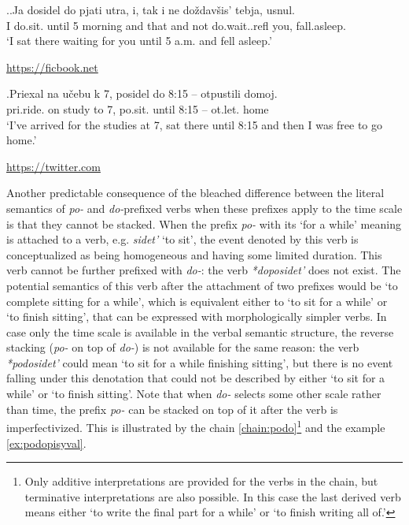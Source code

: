 \ex.\ag.\label{ex:dosidet:do}Ja dosidel do pjati utra, i, tak i ne do\v{z}dav\v{s}is' tebja, usnul.\\
I do.sit. until 5 morning and that and not do.wait..refl you, fall.asleep.\\
\vspace{0.5em}
`I sat there waiting for you until 5 a.m. and fell asleep.'
\begin{flushright}
\vspace{-0.5em}
\url{https://ficbook.net}
\end{flushright}
\bg.\label{ex:posidet:do}Priexal na u\v{c}ebu k 7, posidel do 8:15 -- otpustili domoj.\\
pri.ride. on study to 7, po.sit. until 8:15 -- ot.let. home\\
\vspace{0.5em}
`I've arrived for the studies at 7, sat there until 8:15 and then I was free to go home.'
\begin{flushright}
\vspace{-0.5em}
\url{https://twitter.com}
\end{flushright}

Another predictable consequence of the bleached difference between the literal semantics of \textit{po-} and \textit{do-}prefixed verbs when these prefixes apply to the time scale is that they cannot be stacked. When the prefix \textit{po-} with its `for a while' meaning is attached to a verb, e.g. \textit{sidet'} `to sit', the event denoted by this verb is conceptualized as being homogeneous and having some limited duration. This verb cannot be further prefixed with \textit{do-}: the verb \textit{*doposidet'} does not exist. The potential semantics of this verb after the attachment of two prefixes would be `to complete sitting for a while', which is equivalent either to `to sit for a while' or `to finish sitting', that can be expressed with morphologically simpler verbs. In case only the time scale is available in the verbal semantic structure, the reverse stacking (\textit{po-} on top of \textit{do-}) is not available for the same reason: the verb \textit{*podosidet'} could mean `to sit for a while finishing sitting', but there is no event falling under this denotation that could not be described by either `to sit for a while' or `to finish sitting'. Note that when \textit{do-} selects some other scale rather than time, the prefix \textit{po-} can be stacked on top of it after the verb is imperfectivized. This is illustrated by the chain \ref{chain:podo}\footnote{Only additive interpretations are provided for the verbs in the chain, but terminative interpretations are also possible. In this case the last derived verb means either `to write the final part for a while' or `to finish writing all of.'} and the example \ref{ex:podopisyval}.

